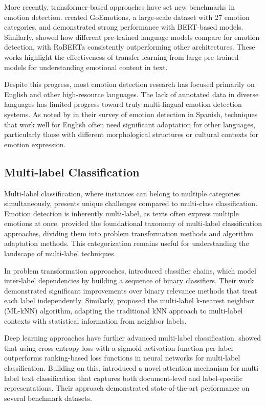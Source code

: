 \documentclass[a4paper,12pt]{extarticle}
\begin{document}
More recently, transformer-based approaches have set new benchmarks in emotion detection. \cite{demszky2020goemotions} created GoEmotions, a large-scale dataset with 27 emotion categories, and demonstrated strong performance with BERT-based models. Similarly, \cite{zhang2022emotion} showed how different pre-trained language models compare for emotion detection, with RoBERTa consistently outperforming other architectures. These works highlight the effectiveness of transfer learning from large pre-trained models for understanding emotional content in text.

Despite this progress, most emotion detection research has focused primarily on English and other high-resource languages. The lack of annotated data in diverse languages has limited progress toward truly multi-lingual emotion detection systems. As noted by \cite{plaza2020overview} in their survey of emotion detection in Spanish, techniques that work well for English often need significant adaptation for other languages, particularly those with different morphological structures or cultural contexts for emotion expression.

\subsection{Multi-label Classification}

Multi-label classification, where instances can belong to multiple categories simultaneously, presents unique challenges compared to multi-class classification. Emotion detection is inherently multi-label, as texts often express multiple emotions at once. \cite{tsoumakas2007multi} provided the foundational taxonomy of multi-label classification approaches, dividing them into problem transformation methods and algorithm adaptation methods. This categorization remains useful for understanding the landscape of multi-label techniques.

In problem transformation approaches, \cite{read2011classifier} introduced classifier chains, which model inter-label dependencies by building a sequence of binary classifiers. Their work demonstrated significant improvements over binary relevance methods that treat each label independently. Similarly, \cite{zhang2007ml} proposed the multi-label k-nearest neighbor (ML-kNN) algorithm, adapting the traditional kNN approach to multi-label contexts with statistical information from neighbor labels.

Deep learning approaches have further advanced multi-label classification. \cite{nam2014large} showed that using cross-entropy loss with a sigmoid activation function per label outperforms ranking-based loss functions in neural networks for multi-label classification. Building on this, \cite{chen2019multi} introduced a novel attention mechanism for multi-label text classification that captures both document-level and label-specific representations. Their approach demonstrated state-of-the-art performance on several benchmark datasets.
\end{document}
